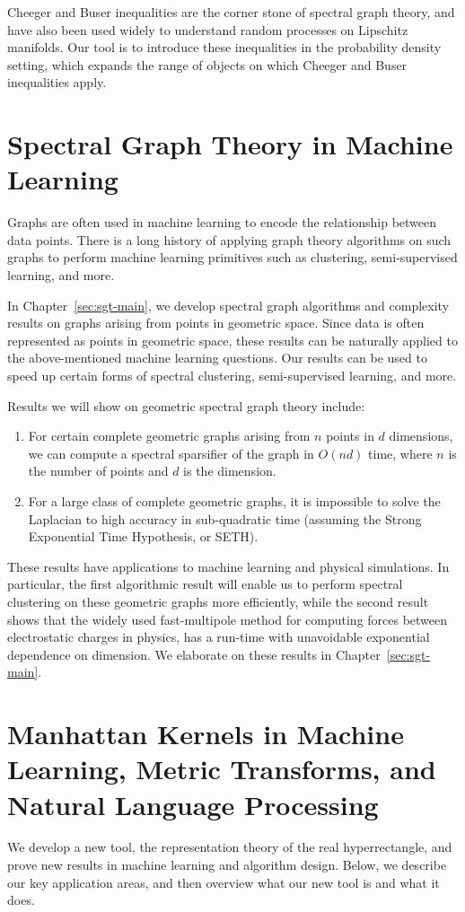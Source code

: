 Cheeger and Buser inequalities are the corner stone of spectral graph
theory, and have also been used widely to understand random processes on
Lipschitz manifolds. Our tool is to introduce these inequalities in the
probability density setting, which expands the range of objects on which
Cheeger and Buser inequalities apply.
\fi


\section{Spectral Graph Theory in Machine
  Learning}\label{sec:sgt}
  Graphs are often used in machine learning to encode the relationship
  between data points. There is a long history of applying graph theory
  algorithms on such graphs to perform machine learning primitives such
  as clustering, semi-supervised learning, and more.

  In Chapter~\ref{sec:sgt-main}, we develop spectral graph
  algorithms and complexity results on graphs arising from points in geometric space. Since
  data is often represented as points in geometric space, these
  results can be naturally applied to the above-mentioned machine
  learning questions. Our results can be used to speed up certain forms of spectral clustering, semi-supervised
  learning, and more.

  Results we will show on geometric spectral graph theory include: 
  \begin{enumerate}
  \item For certain complete geometric graphs arising from $n$ points in
  $d$ dimensions, we can compute a spectral
  sparsifier of the graph in $O(nd)$ time, where $n$ is the number of
  points and $d$ is the dimension.
  \item  For a large class of complete geometric graphs, it is
  impossible to solve the Laplacian to high accuracy in sub-quadratic
  time (assuming the Strong Exponential Time Hypothesis, or SETH).
  \end{enumerate}
  These results have applications to machine learning and physical
  simulations. In particular, the first algorithmic result will enable us to perform
  spectral clustering on these geometric graphs more efficiently, while
  the second result shows that the widely used fast-multipole method for
  computing forces between electrostatic charges in physics, has a
  run-time with unavoidable exponential dependence on dimension. We
  elaborate on these results in Chapter~\ref{sec:sgt-main}.
  

\iffalse
\section{Manhattan Kernels in Machine Learning, Metric Transforms, and Natural
  Language Processing}
      We develop a new tool, the representation theory of the real
      hyperrectangle, and prove new results in machine learning and algorithm design. Below, we describe our key application
      areas, and then overview what our new tool is and what it does.
